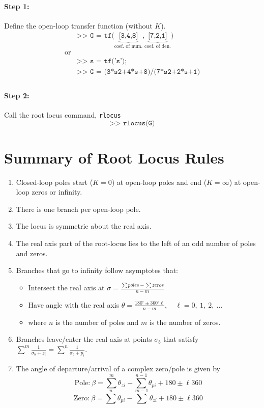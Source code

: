 \documentclass{book}
\begin{document}
	\paragraph{Step 1:} Define the open-loop transfer function (without $ K $).
	\begin{align*}
	&\texttt{>> G = tf(}\underbrace{\texttt{[3,4,8]}}_{\textrm{coef. of num.}}\texttt{,}\underbrace{\texttt{[7,2,1]}}_{\textrm{coef. of den.}}\texttt{)}\\
	\textrm{or} & \\
	& \texttt{>> s = tf('s');}\\
	& \texttt{>> G = (3*s\^{}2+4*s+8)/(7*s\^{}2+2*s+1)}\\
	\end{align*}
	\paragraph{Step 2:} Call the root locus command, \texttt{rlocus}
	\[ \texttt{>> rlocus(G)} \]
	
	\section*{Summary of Root Locus Rules}
	\begin{enumerate}
		\item Closed-loop poles start ($ K=0 $) at open-loop poles and end ($ K=\infty $) at open-loop zeros or infinity.
		\item There is one branch per open-loop pole.
		\item The locus is symmetric about the real axis.
		\item The real axis part of the root-locus lies to the left of an odd number of poles and zeros.
		\item Branches that go to infinity follow asymptotes that:
		\begin{itemize}
			\item Intersect the real axis at $ \sigma = \frac{\sum poles - \sum zeros}{n-m} $
			\item Have angle with the real axis $\theta = \frac{180^\circ\pm 360^\circ \ell}{n-m},\quad \ell = 0,\ 1,\ 2,\ \ldots $
			\item where $ n $ is the number of poles and $ m $ is the number of zeros.
		\end{itemize}
		\item Branches leave/enter the real axis at points $ \sigma_b $ that satisfy $ \sum^m \frac{1}{\sigma_b+z_i} = \sum^n \frac{1}{\sigma_b+p_i} $.
		\item The angle of departure/arrival of a complex zero/pole is given by
		\[ \textrm{Pole:}\ \beta = \sum^m \theta_{zi} - \sum^{n-1} \theta_{pi} + 180 \pm\ell360 \]
		\[ \textrm{Zero:}\ \beta = \sum^n \theta_{pi} - \sum^{m-1} \theta_{zi} + 180 \pm\ell360 \]
	\end{enumerate}
	
\end{document}
